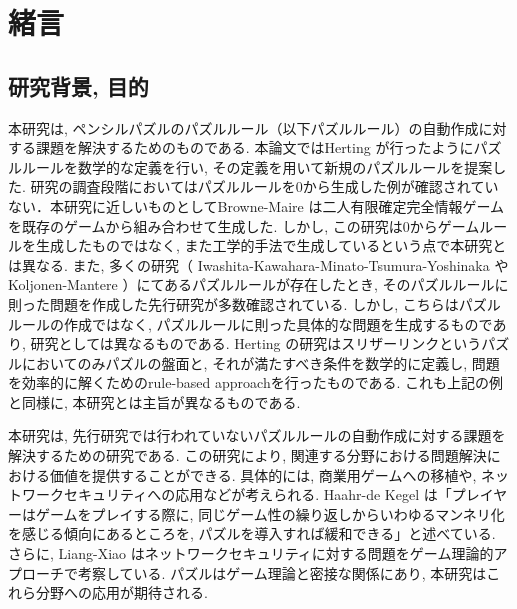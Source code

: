 \chapter{緒言}
\section{研究背景, 目的}\label{section:Introduction}
本研究は, ペンシルパズルのパズルルール（以下パズルルール）の自動作成に対する課題を解決するためのものである. 本論文ではHerting \cite{Herting2004}が行ったようにパズルルールを数学的な定義を行い, その定義を用いて新規のパズルルールを提案した. 研究の調査段階においてはパズルルールを0から生成した例が確認されていない．本研究に近しいものとしてBrowne-Maire \cite{Browne2010}は二人有限確定完全情報ゲームを既存のゲームから組み合わせて生成した. しかし, この研究は0からゲームルールを生成したものではなく, また工学的手法で生成しているという点で本研究とは異なる. また, 多くの研究（
Iwashita-Kawahara-Minato-Tsumura-Yoshinaka
\cite{Yoshinaka2012}やKoljonen-Mantere \cite{Mantere2007}）にてあるパズルルールが存在したとき, そのパズルルールに則った問題を作成した先行研究が多数確認されている. しかし, こちらはパズルルールの作成ではなく, パズルルールに則った具体的な問題を生成するものであり, 研究としては異なるものである. Herting	 \cite{Herting2004}の研究はスリザーリンクというパズルにおいてのみパズルの盤面と, それが満たすべき条件を数学的に定義し, 問題を効率的に解くためのrule-based approachを行ったものである. これも上記の例と同様に, 本研究とは主旨が異なるものである.

本研究は, 先行研究では行われていないパズルルールの自動作成に対する課題を解決するための研究である. この研究により, 関連する分野における問題解決における価値を提供することができる. 具体的には, 商業用ゲームへの移植や, ネットワークセキュリティへの応用などが考えられる. Haahr-de Kegel \cite{Barbara2020}は「プレイヤーはゲームをプレイする際に, 同じゲーム性の繰り返しからいわゆるマンネリ化を感じる傾向にあるところを, パズルを導入すれば緩和できる」と述べている. さらに, Liang-Xiao \cite{Liang2013}はネットワークセキュリティに対する問題をゲーム理論的アプローチで考察している. パズルはゲーム理論と密接な関係にあり, 	本研究はこれら分野への応用が期待される.

